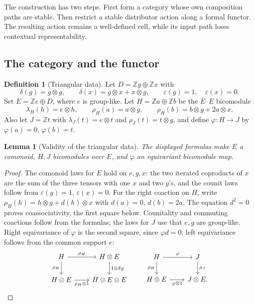 \documentclass[11pt,a4paper]{article}
\newtheorem{lemma}[theorem]{Lemma}
\theoremstyle{definition}
\newtheorem{definition}[theorem]{Definition}
\theoremstyle{remark}
\numberwithin{equation}{section}
\newcommand{\Z}{\mathbb Z}
\newcommand{\eps}{\varepsilon}
\begin{document}
The construction has two steps. First form a category whose own
composition paths are stable. Then restrict a stable distributor action
along a formal functor. The resulting action remains a well-defined
cell, while its input path loses contextual representability.

\subsection{The category and the functor}

\begin{definition}[Triangular data]\label{def:triangular-data}
Let $D=\Z g\oplus\Z x$ with
\[
\delta(g)=g\otimes g,\qquad
\delta(x)=g\otimes x+x\otimes g,\qquad
\eps(g)=1,\quad\eps(x)=0.
\]
Set $E=\Z e\oplus D$, where $e$ is group-like. Let
$H=\Z a\oplus\Z b$ be the $E$--$E$ bicomodule
\begin{equation}\label{eq:H}
\lambda_H(h)=e\otimes h,\qquad
\rho_H(a)=a\otimes g,\qquad
\rho_H(b)=b\otimes g+2a\otimes x.
\end{equation}
Also let $J=\Z t$ with $\lambda_J(t)=e\otimes t$ and
$\rho_J(t)=t\otimes g$, and define $\varphi:H\to J$ by
$\varphi(a)=0$, $\varphi(b)=t$.
\end{definition}

\begin{lemma}[Validity of the triangular data]\label{lem:triangular-data}
The displayed formulas make $E$ a comonoid, $H,J$ bicomodules over
$E$, and $\varphi$ an equivariant bicomodule map.
\end{lemma}
\begin{proof}
The comonoid laws for $E$ hold on $e,g,x$: the two iterated coproducts
of $x$ are the sum of the three tensors with one $x$ and two $g$'s,
and the counit laws follow from $\eps(g)=1$, $\eps(x)=0$.
For the right coaction on $H$, write
$\rho_H(h)=h\otimes g+d(h)\otimes x$ with $d(a)=0$, $d(b)=2a$.
The equation $d^2=0$ proves coassociativity, the first square below.
Counitality and commuting coactions follow from the formulas; the
laws for $J$ use that $e,g$ are group-like.
Right equivariance of $\varphi$ is the second square, since
$\varphi d=0$; left equivariance follows from the common support $e$:
\[
\begin{tikzcd}[column sep=2.1em]
H \arrow[r,"\rho_H"] \arrow[d,"\rho_H"'] &
H\otimes E \arrow[d,"1\otimes\delta_E"]\\
H\otimes E \arrow[r,"\rho_H\otimes1"'] & H\otimes E\otimes E
\end{tikzcd}
\qquad
\begin{tikzcd}[column sep=2.1em]
H \arrow[r,"\varphi"] \arrow[d,"\rho_H"'] &
J \arrow[d,"\rho_J"]\\
H\otimes E \arrow[r,"\varphi\otimes1"'] & J\otimes E.
\end{tikzcd}
\]

\end{proof}
\end{document}
